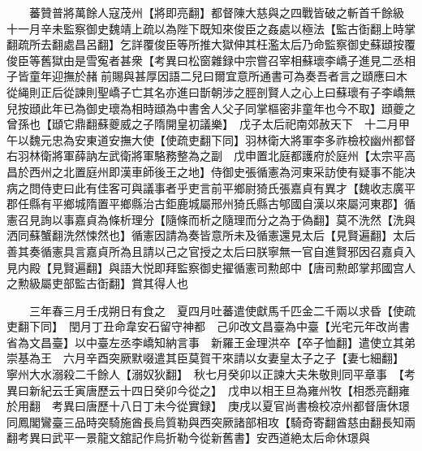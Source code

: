 　　蕃贊普將萬餘人寇茂州【將即亮翻】都督陳大慈與之四戰皆破之斬首千餘級　十一月辛未監察御史魏靖上疏以為陛下既知來俊臣之姦處以極法【監古衘翻上時掌翻疏所去翻處昌呂翻】乞詳覆俊臣等所推大獄伸其枉濫太后乃命監察御史蘇頲按覆俊臣等舊獄由是雪寃者甚衆【考異曰松窗雜録中宗嘗召宰相蘇瓌李嶠子進見二丞相子皆童年迎撫於赭前賜與甚厚因語二兒曰爾宜意所通書可為奏吾者言之頲應曰木從䋲則正后從諫則聖嶠子亡其名亦進曰斮朝涉之脛剖賢人之心上曰蘇瓌有子李嶠無兒按頲此年已為御史瓌為相時頲為中書舍人父子同掌樞密非童年也今不取】頲夔之曾孫也【頲它鼎翻蘇夔威之子隋開皇初議樂】　戊子太后祀南郊赦天下　十二月甲午以魏元忠為安東道安撫大使【使疏吏翻下同】羽林衛大將軍李多祚檢校幽州都督右羽林衛將軍薛訥左武衛將軍駱務整為之副　戊申置北庭都護府於庭州【太宗平高昌於西州之北置庭州即漢車師後王之地】侍御史張循憲為河東采訪使有疑事不能决病之問侍吏曰此有佳客可與議事者乎吏言前平鄉尉猗氏張嘉貞有異才【魏收志廣平郡任縣有平鄉城隋置平鄉縣治古鉅鹿城屬邢州猗氏縣古郇國自漢以來屬河東郡】循憲召見詢以事嘉貞為條析理分【隨條而析之隨理而分之為于偽翻】莫不洗然【洗與洒同蘇蟹翻洗然悚然也】循憲因請為奏皆意所未及循憲還見太后【見賢遍翻】太后善其奏循憲具言嘉貞所為且請以己之官授之太后曰朕寧無一官自進賢邪因召嘉貞入見内殿【見賢遍翻】與語大悦即拜監察御史擢循憲司勲郎中【唐司勲郎掌邦國宫人之勲級屬吏部監古衘翻】賞其得人也

　　三年春三月壬戌朔日有食之　夏四月吐蕃遣使獻馬千匹金二千兩以求昏【使疏吏翻下同】　閏月丁丑命韋安石留守神都　己卯改文昌臺為中臺【光宅元年改尚書省為文昌臺】以中臺左丞李嶠知納言事　新羅王金理洪卒【卒子恤翻】遣使立其弟崇基為王　六月辛酉突厥默啜遣其臣莫賀干來請以女妻皇太子之子【妻七細翻】　寧州大水溺殺二千餘人【溺奴狄翻】　秋七月癸卯以正諫大夫朱敬則同平章事　【考異曰新紀云壬寅唐歷云十四日癸卯今從之】　戊申以相王旦為雍州牧【相悉亮翻雍於用翻　考異曰唐歷十八日丁未今從實録】　庚戌以夏官尚書檢校凉州都督唐休璟同鳳閣鸞臺三品時突騎施酋長烏質勒與西突厥諸部相攻【騎奇寄翻酋慈由翻長知兩翻考異曰武平一景龍文舘記作烏折勒今從新舊書】安西道絶太后命休璟與

